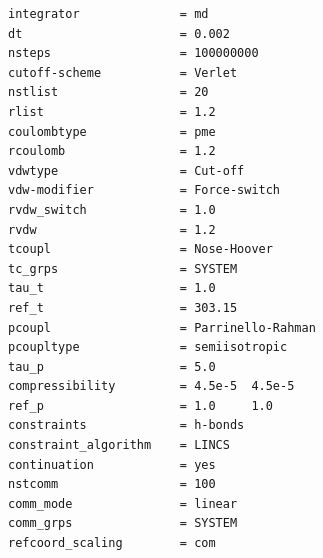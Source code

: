 \documentclass[
  twocolumn]{biophys-new-mod}
\begin{document}
\begin{verbatim}
integrator              = md
dt                      = 0.002
nsteps                  = 100000000
cutoff-scheme           = Verlet
nstlist                 = 20
rlist                   = 1.2
coulombtype             = pme
rcoulomb                = 1.2
vdwtype                 = Cut-off
vdw-modifier            = Force-switch
rvdw_switch             = 1.0
rvdw                    = 1.2
tcoupl                  = Nose-Hoover
tc_grps                 = SYSTEM
tau_t                   = 1.0
ref_t                   = 303.15
pcoupl                  = Parrinello-Rahman
pcoupltype              = semiisotropic
tau_p                   = 5.0
compressibility         = 4.5e-5  4.5e-5
ref_p                   = 1.0     1.0
constraints             = h-bonds
constraint_algorithm    = LINCS
continuation            = yes
nstcomm                 = 100
comm_mode               = linear
comm_grps               = SYSTEM
refcoord_scaling        = com
\end{verbatim}
\end{document}

